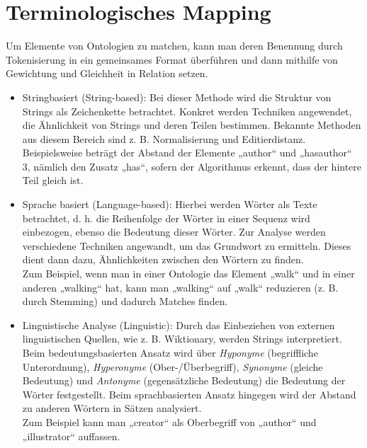 	\section{Terminologisches Mapping}
	Um Elemente von Ontologien zu matchen, kann man deren Benennung durch
	Tokenisierung in ein gemeinsames Format überführen und dann mithilfe von
	Gewichtung und Gleichheit in Relation setzen.
	\begin{itemize}
		\item Stringbasiert (String-based): Bei dieser Methode wird die Struktur von
		Strings als Zeichenkette betrachtet. Konkret werden Techniken angewendet, die Ähnlichkeit
		von Strings und deren Teilen bestimmen. Bekannte Methoden aus diesem Bereich
		sind z. B. Normalisierung und Editierdistanz. \cite{EuzShv07}\\
		Beispielsweise beträgt der Abstand der Elemente „author“ und „hasauthor“ 3,
		nämlich den Zusatz „has“, sofern der Algorithmus erkennt, dass der hintere Teil gleich ist.
		\item  Sprache basiert (Language-based): Hierbei werden Wörter als Texte
		betrachtet, d. h.
		die Reihenfolge der Wörter in einer Sequenz wird einbezogen, ebenso die
		Bedeutung dieser Wörter. Zur Analyse werden verschiedene Techniken angewandt,
		um das Grundwort zu ermitteln. Dieses dient dann dazu, Ähnlichkeiten zwischen
		den Wörtern zu finden. \cite{EuzShv07}\\
		Zum Beispiel, wenn man in einer Ontologie das Element „walk“ und in einer
		anderen „walking“ hat, kann man „walking“ auf „walk“ reduzieren (z. B. durch
		Stemming) und dadurch Matches finden.
		\item Linguistische Analyse (Linguistic): Durch das Einbeziehen von externen
		linguistischen Quellen, wie z. B. Wiktionary, werden Strings interpretiert.
		Beim bedeutungsbasierten Ansatz wird über \textit{Hyponyme} (begriffliche
		Unterordnung), \textit{Hyperonyme} (Ober-/Überbegriff), \textit{Synonyme}
		(gleiche Bedeutung) und \textit{Antonyme} (gegensätzliche Bedeutung) die
		Bedeutung der Wörter festgestellt. Beim sprachbasierten Ansatz hingegen wird
		der Abstand zu anderen Wörtern in Sätzen analysiert. \cite{EuzShv07}\\
		Zum Beispiel kann man „creator“ als Oberbegriff von „author“ und
		„illustrator“ auffassen.
	\end{itemize}
	
